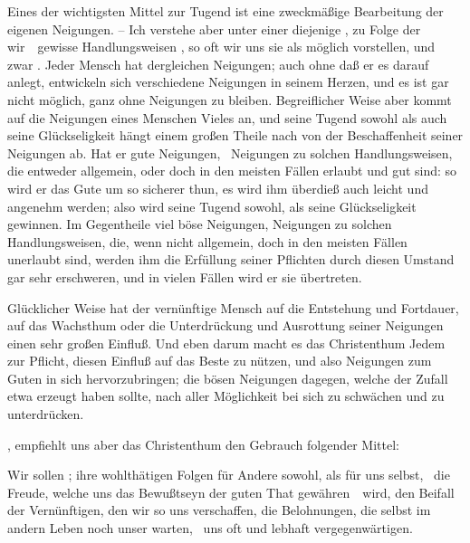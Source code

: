 \begin{aufza}
\item Eines der wichtigsten Mittel zur Tugend ist eine zweckmäßige Bearbeitung der eigenen Neigungen. -- Ich verstehe aber unter einer  diejenige , zu Folge der wir~\ gewisse Handlungsweisen , so oft wir uns sie als möglich vorstellen, und zwar . Jeder Mensch hat dergleichen Neigungen; auch ohne daß er es darauf anlegt, entwickeln sich verschiedene Neigungen in seinem Herzen, und es ist gar nicht möglich, ganz ohne Neigungen zu bleiben. Begreiflicher Weise aber kommt auf die Neigungen eines Menschen Vieles an, und seine Tugend sowohl als auch seine Glückseligkeit hängt einem großen Theile nach von der Beschaffenheit seiner Neigungen ab. Hat er gute Neigungen, \dh\  Neigungen zu solchen Handlungsweisen, die entweder allgemein, oder doch in den meisten Fällen erlaubt und gut sind: so wird er das Gute um so sicherer thun, es wird ihm überdieß auch leicht und angenehm werden; also wird seine Tugend sowohl, als seine Glückseligkeit gewinnen. Im Gegentheile viel böse Neigungen, Neigungen zu solchen Handlungsweisen, die, wenn nicht allgemein, doch in den meisten Fällen unerlaubt sind, werden ihm die Erfüllung seiner Pflichten durch diesen Umstand gar sehr erschweren, und in vielen Fällen wird er sie übertreten.
\item Glücklicher Weise hat der vernünftige Mensch auf die Entstehung und Fortdauer, auf das Wachsthum oder die Unterdrückung und Ausrottung seiner Neigungen einen sehr großen Einfluß. Und eben darum macht es das Christenthum Jedem zur Pflicht, diesen Einfluß auf das Beste zu nützen, und also Neigungen zum Guten in sich hervorzubringen; die bösen Neigungen dagegen, welche der Zufall etwa erzeugt haben sollte, nach aller Möglichkeit bei sich zu schwächen und zu unterdrücken.
\item {}, empfiehlt uns aber das Christenthum den Gebrauch folgender Mittel:
\begin{aufzb}
\item Wir sollen ; ihre wohlthätigen Folgen für Andere sowohl, als für uns selbst, \zB\  die Freude, welche uns das Bewußtseyn der guten That gewähren~\ wird, den Beifall der Vernünftigen, den wir so uns verschaffen, die Belohnungen, die selbst im andern Leben noch unser warten, \usw\ uns oft und lebhaft vergegenwärtigen.

\end{aufzb}
\end{aufza}

